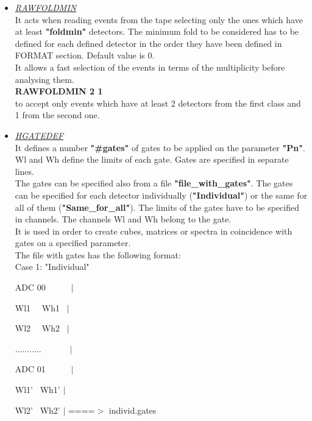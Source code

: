 \begin{itemize}
 \item	{\it\underline{RAWFOLDMIN}} \\

	It acts when reading events from the tape selecting only the ones 
	which have at least {\bf "foldmin"} detectors. The minimum fold to 
	be considered has to be defined for each defined detector in the order
	they have been defined in FORMAT section. Default value is 0.\\
	It allows a fast selection of the events in terms of the
	multiplicity before analysing them.\\

	\hskip1.0cm {\bf RAWFOLDMIN 2 1} \\
 	to accept only events which have at least 2 detectors from the first 
	class and 1 from the second one.

 \item	{\it\underline{HGATEDEF}} \\

	It defines a number {\bf "\#gates"} of gates to be applied on the
	parameter {\bf "Pn"}. Wl and Wh define the limits of each 
	gate. Gates are specified in separate lines. \\
	The gates can be specified also from a file {\bf "file\_with\_gates"}.
	The gates can be
	specified for each detector individually ({\bf "Individual"}) or
	the same for all of them ({\bf "Same\_for\_all"}). The limits of the 
	gates have to be specified in channels. 
	The channels Wl and Wh belong to the gate.   \\

	It is used in order to create cubes, matrices or spectra in
	coincidence with gates on a specified parameter.\\

	The file with gates has the following format:\\
	
	\hskip1.0cm Case 1: "Individual"

	\hskip1.5cm ADC 00~~~~~~$|$

	\hskip1.5cm Wl1	~~Wh1 ~$|$

	\hskip1.5cm Wl2	~~Wh2 ~$|$

	\hskip1.5cm ........... ~~~~~~$|$

	\hskip1.5cm ADC 01~~~~~~$|$

	\hskip1.5cm Wl1' ~Wh1'  $|$

	\hskip1.5cm Wl2' ~Wh2'  $|$   ====$>$  individ.gates


\end{itemize}
